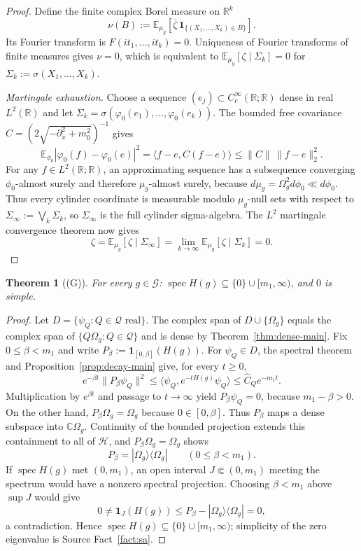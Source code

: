 \documentclass[11pt,a4paper]{article}
\theoremstyle{plain}
\newtheorem{theorem}{Theorem}[section]
\theoremstyle{definition}
\newcommand{\R}{\mathbb{R}}
\newcommand{\E}{\mathbb{E}}
\newcommand{\G}{\mathcal{G}}
\newcommand{\Q}{\mathcal{Q}}
\newcommand{\HH}{\mathcal{H}}
\newcommand{\Om}{\Omega}
\newcommand{\ip}[2]{\langle #1,#2\rangle}
\DeclareMathOperator{\spec}{spec}
\begin{document}
\begin{proof}
Define the finite complex Borel measure on $\R^k$
\[
 \nu(B):=\E_{\mu_g}\!\left[\overline\zeta\,
   \mathbf1_{\{(X_1,\ldots,X_k)\in B\}}\right].
\]
Its Fourier transform is $F(it_1,\ldots,it_k)=0$. Uniqueness of Fourier transforms of finite
measures gives $\nu=0$, which is equivalent to
$\E_{\mu_g}[\zeta\mid\Sigma_k]=0$ for
$\Sigma_k:=\sigma(X_1,\ldots,X_k)$.

\emph{Martingale exhaustion.} Choose a sequence
$(e_j)\subset C_c^\infty(\R;\R)$ dense in real $L^2(\R)$ and let
$\Sigma_k=\sigma(\varphi_0(e_1),\ldots,\varphi_0(e_k))$. The bounded free covariance
$C=(2\sqrt{-\partial_x^2+m_0^2})^{-1}$ gives
\[
 \E_{\phi_0}|\varphi_0(f)-\varphi_0(e)|^2
 =\ip{f-e}{C(f-e)}
 \le\|C\|\,\|f-e\|_2^2.
\]
For any $f\in L^2(\R;\R)$, an approximating sequence has a subsequence converging
$\phi_0$-almost surely and therefore $\mu_g$-almost surely, because
$d\mu_g=\Om_g^2d\phi_0\ll d\phi_0$. Thus every cylinder coordinate is measurable modulo
$\mu_g$-null sets with respect to $\Sigma_\infty:=\bigvee_k\Sigma_k$, so
$\Sigma_\infty$ is the full cylinder sigma-algebra. The $L^2$ martingale convergence theorem
now gives
\[
 \zeta=\E_{\mu_g}[\zeta\mid\Sigma_\infty]
 =\lim_{k\to\infty}\E_{\mu_g}[\zeta\mid\Sigma_k]=0.
\]
\end{proof}

\begin{theorem}[(G)]\label{thm:G-main}
For every $g\in\G$:\quad
$\spec H(g)\subseteq\{0\}\cup[m_1,\infty)$, and $0$ is simple.
\end{theorem}

\begin{proof}
Let $D=\{\psi_Q:Q\in\Q\text{ real}\}$. The complex span of
$D\cup\{\Om_g\}$ equals the complex span of $\{Q\Om_g:Q\in\Q\}$ and is dense by
Theorem~\ref{thm:dense-main}. Fix $0\le\beta<m_1$ and write
$P_\beta:=\mathbf1_{[0,\beta]}(H(g))$. For $\psi_Q\in D$, the spectral theorem and
Proposition~\ref{prop:decay-main} give, for every $t\ge0$,
\[
 e^{-\beta t}\|P_\beta\psi_Q\|^2
 \le\ip{\psi_Q}{e^{-tH(g)}\psi_Q}
 \le\widehat C_Qe^{-m_1t}.
\]
Multiplication by $e^{\beta t}$ and passage to $t\to\infty$ yield
$P_\beta\psi_Q=0$, because $m_1-\beta>0$. On the other hand,
$P_\beta\Om_g=\Om_g$ because $0\in[0,\beta]$. Thus $P_\beta$ maps a dense subspace into
$\mathbb C\Om_g$. Continuity of the bounded projection extends this containment to all of
$\HH$, and $P_\beta\Om_g=\Om_g$ shows
\[
 P_\beta=|\Om_g\rangle\langle\Om_g|\qquad(0\le\beta<m_1).
\]
If $\spec H(g)$ met $(0,m_1)$, an open interval
$J\Subset(0,m_1)$ meeting the spectrum would have a nonzero spectral projection. Choosing
$\beta<m_1$ above $\sup J$ would give
\[
 0\ne\mathbf1_J(H(g))
 \le P_\beta-|\Om_g\rangle\langle\Om_g|=0,
\]
a contradiction. Hence $\spec H(g)\subseteq\{0\}\cup[m_1,\infty)$; simplicity of the zero
eigenvalue is Source Fact~\ref{fact:sa}.
\end{proof}
\end{document}
